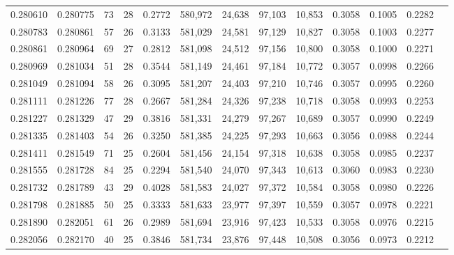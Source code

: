 \begin{tabular}{rrrrrrrrrrrrr}
0.280610 & 0.280775 &  73 &  28 &                                     0.2772 & 580,972 &  24,638 &  97,103 &  10,853 & 0.3058 & 0.1005 & 0.2282 \\
0.280783 & 0.280861 &  57 &  26 &                                     0.3133 & 581,029 &  24,581 &  97,129 &  10,827 & 0.3058 & 0.1003 & 0.2277 \\
0.280861 & 0.280964 &  69 &  27 &                                     0.2812 & 581,098 &  24,512 &  97,156 &  10,800 & 0.3058 & 0.1000 & 0.2271 \\
0.280969 & 0.281034 &  51 &  28 &                                     0.3544 & 581,149 &  24,461 &  97,184 &  10,772 & 0.3057 & 0.0998 & 0.2266 \\
0.281049 & 0.281094 &  58 &  26 &                                     0.3095 & 581,207 &  24,403 &  97,210 &  10,746 & 0.3057 & 0.0995 & 0.2260 \\
0.281111 & 0.281226 &  77 &  28 &                                     0.2667 & 581,284 &  24,326 &  97,238 &  10,718 & 0.3058 & 0.0993 & 0.2253 \\
0.281227 & 0.281329 &  47 &  29 &                                     0.3816 & 581,331 &  24,279 &  97,267 &  10,689 & 0.3057 & 0.0990 & 0.2249 \\
0.281335 & 0.281403 &  54 &  26 &                                     0.3250 & 581,385 &  24,225 &  97,293 &  10,663 & 0.3056 & 0.0988 & 0.2244 \\
0.281411 & 0.281549 &  71 &  25 &                                     0.2604 & 581,456 &  24,154 &  97,318 &  10,638 & 0.3058 & 0.0985 & 0.2237 \\
0.281555 & 0.281728 &  84 &  25 &                                     0.2294 & 581,540 &  24,070 &  97,343 &  10,613 & 0.3060 & 0.0983 & 0.2230 \\
0.281732 & 0.281789 &  43 &  29 &                                     0.4028 & 581,583 &  24,027 &  97,372 &  10,584 & 0.3058 & 0.0980 & 0.2226 \\
0.281798 & 0.281885 &  50 &  25 &                                     0.3333 & 581,633 &  23,977 &  97,397 &  10,559 & 0.3057 & 0.0978 & 0.2221 \\
0.281890 & 0.282051 &  61 &  26 &                                     0.2989 & 581,694 &  23,916 &  97,423 &  10,533 & 0.3058 & 0.0976 & 0.2215 \\
0.282056 & 0.282170 &  40 &  25 &                                     0.3846 & 581,734 &  23,876 &  97,448 &  10,508 & 0.3056 & 0.0973 & 0.2212 \\

\end{tabular}
